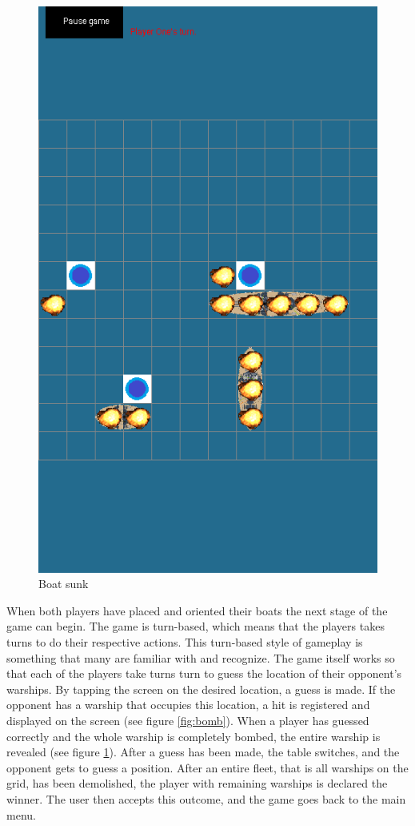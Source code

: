 \begin{figure}[ht]
\begin{minipage}[b]{0.325\linewidth}
		\includegraphics[scale=0.225]{img/Screenshot_sunk.png}
		\caption{Boat sunk}
		\label{fig:sunk}
	\end{minipage}

\end{figure}
When both players have placed and oriented their boats the next stage of the game can begin.
The game is turn-based, which means that the players takes turns to do their respective actions. This turn-based style of gameplay is something that many are familiar with and recognize. The game itself works so that each of the players take turns turn to guess the location of their opponent's warships. By tapping the screen on the desired location, a guess is made. If the opponent has a warship that occupies this location, a hit is registered and displayed on the screen (see figure \ref{fig:bomb}). When a player has guessed correctly and the whole warship is completely bombed, the entire warship is revealed (see figure \ref{fig:sunk}). After a guess has been made, the table switches, and the opponent gets to guess a position. After an entire fleet, that is all warships on the grid, has been demolished, the player with remaining warships is declared the winner. The user then accepts this outcome, and the game goes back to the main menu.


